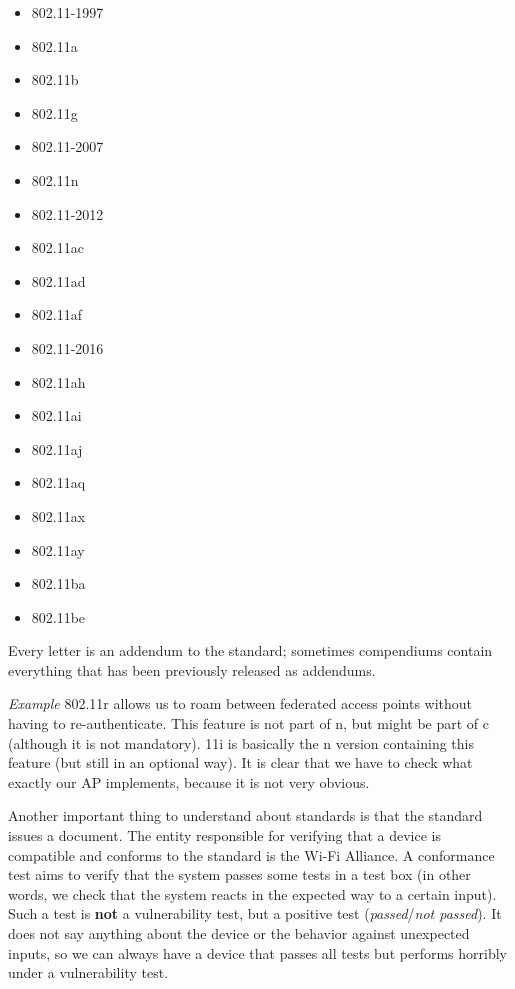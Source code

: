 \begin{multicols}{3}
\begin{itemize}
    \item 802.11-1997
    \item 802.11a
    \item 802.11b
    \item 802.11g
    \item 802.11-2007
    \item 802.11n
    \item 802.11-2012
    \item 802.11ac
    \item 802.11ad
    \item 802.11af
    \item 802.11-2016
    \item 802.11ah
    \item 802.11ai
    \item 802.11aj
    \item 802.11aq
    \item 802.11ax
    \item 802.11ay
    \item 802.11ba
    \item 802.11be
\end{itemize}
\end{multicols}

Every letter is an addendum to the standard; sometimes compendiums contain everything that has been previously released as addendums.

\vspace{0.5em}

\emph{Example} 802.11r allows us to roam between federated access points without having to re-authenticate. This feature is not part of n, but might be part of c (although it is not mandatory). 11i is basically the n version containing this feature (but still in an optional way). It is clear that we have to check what exactly our AP implements, because it is not very obvious.

\vspace{0.5em}

Another important thing to understand about standards is that the standard issues a document. The entity responsible for verifying that a device is compatible and conforms to the standard is the Wi-Fi Alliance. A conformance test aims to verify that the system passes some tests in a test box (in other words, we check that the system reacts in the expected way to a certain input). Such a test is \textbf{not} a vulnerability test, but a positive test (\textit{passed}/\textit{not passed}). It does not say anything about the device or the behavior against unexpected inputs, so we can always have a device that passes all tests but performs horribly under a vulnerability test.

